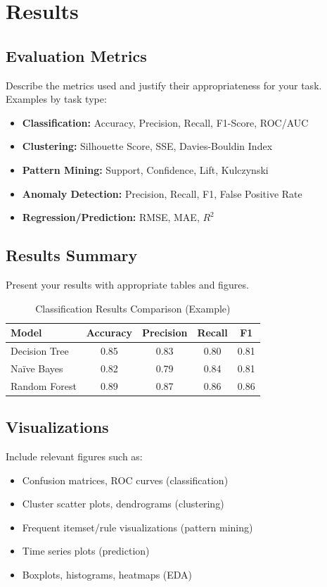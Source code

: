 \documentclass[conference]{IEEEtran}
\begin{document}
	\section{Results}
	\label{sec:results}
	
	\subsection{Evaluation Metrics}
	Describe the metrics used and justify their appropriateness for your task. Examples by task type:
	\begin{itemize}
		\item \textbf{Classification:} Accuracy, Precision, Recall, F1-Score, ROC/AUC
		\item \textbf{Clustering:} Silhouette Score, SSE, Davies-Bouldin Index
		\item \textbf{Pattern Mining:} Support, Confidence, Lift, Kulczynski
		\item \textbf{Anomaly Detection:} Precision, Recall, F1, False Positive Rate
		\item \textbf{Regression/Prediction:} RMSE, MAE, $R^2$
	\end{itemize}
	
	\subsection{Results Summary}
	Present your results with appropriate tables and figures.
	
	\begin{table}[htbp]
		\caption{Classification Results Comparison (Example)}
		\begin{center}
			\begin{tabular}{|l|c|c|c|c|}
				\hline
				\textbf{Model} & \textbf{Accuracy} & \textbf{Precision} & \textbf{Recall} & \textbf{F1} \\
				\hline
				Decision Tree & 0.85 & 0.83 & 0.80 & 0.81 \\
				\hline
				Na\"ive Bayes & 0.82 & 0.79 & 0.84 & 0.81 \\
				\hline
				Random Forest & 0.89 & 0.87 & 0.86 & 0.86 \\
				\hline
			\end{tabular}
			\label{tab:results}
		\end{center}
	\end{table}
	
	\subsection{Visualizations}
	Include relevant figures such as:
	\begin{itemize}
		\item Confusion matrices, ROC curves (classification)
		\item Cluster scatter plots, dendrograms (clustering)
		\item Frequent itemset/rule visualizations (pattern mining)
		\item Time series plots (prediction)
		\item Boxplots, histograms, heatmaps (EDA)
	\end{itemize}
	
\end{document}
